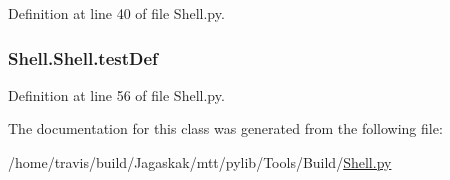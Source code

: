 Definition at line 40 of file Shell.\-py.

\hypertarget{classShell_1_1Shell_ac2533422279cd3b3d3bc43e8b3de1301}{
\subsubsection[{test\-Def}]{\setlength{\rightskip}{0pt plus 5cm}Shell.\-Shell.\-test\-Def}}\label{classShell_1_1Shell_ac2533422279cd3b3d3bc43e8b3de1301}


Definition at line 56 of file Shell.\-py.



The documentation for this class was generated from the following file\-:\begin{DoxyCompactItemize}
\item 
/home/travis/build/\-Jagaskak/mtt/pylib/\-Tools/\-Build/\hyperlink{Shell_8py}{Shell.\-py}\end{DoxyCompactItemize}
